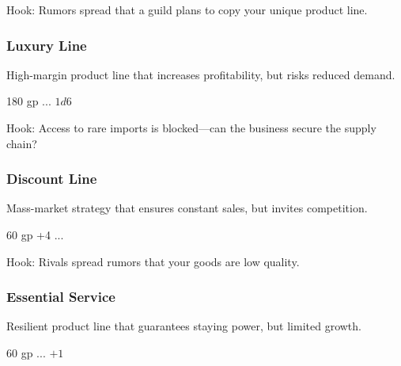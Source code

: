 \documentclass[twocolumn]{dndbook}
\begin{document}
Hook: Rumors spread that a guild plans to copy your unique product line.\par


\subsubsection{Luxury Line}

High-margin product line that increases profitability, but risks reduced demand.\par

\begin{DndComment}[color=bgtan2018]{}
	\hfill 180 gp
	\hfill ...
	\hfill $1d6$
\end{DndComment}


Hook: Access to rare imports is blocked—can the business secure the supply chain?\par


\subsubsection{Discount Line}

Mass-market strategy that ensures constant sales, but invites competition.\par

\begin{DndComment}[color=bgtan2018]{}
	\hfill 60 gp
	\hfill +4
	\hfill ...
\end{DndComment}

Hook: Rivals spread rumors that your goods are low quality.\par


\subsubsection{Essential Service}

Resilient product line that guarantees staying power, but limited growth.\par

\begin{DndComment}[color=bgtan2018]{}
	\hfill 60 gp
	\hfill ...
	\hfill $+1$
\end{DndComment}
\end{document}
